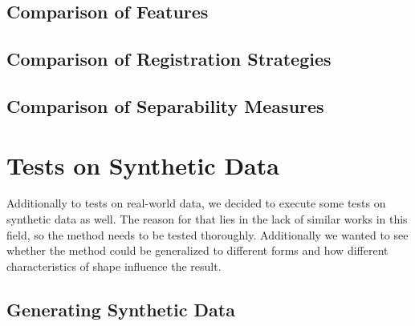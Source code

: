 \documentclass[pdftex,12pt,a4paper]{report}
\begin{document}
\subsection{Comparison of Features}

\subsection{Comparison of Registration Strategies}

\subsection{Comparison of Separability Measures}

\section{Tests on Synthetic Data}

Additionally to tests on real-world data, we decided to execute some tests on synthetic data as well. The reason for that lies in the lack of similar works in this field, so the method needs to be tested thoroughly. Additionally we wanted to see whether the method could be generalized to different forms and how different characteristics of shape influence the result. 

\subsection{Generating Synthetic Data}
\end{document}
